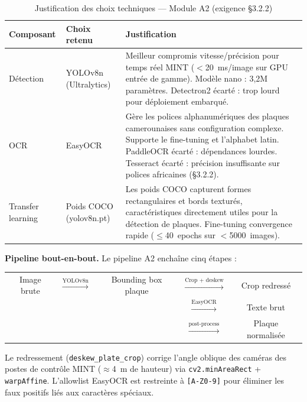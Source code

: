 \begin{table}[H]
  \centering
  \caption{Justification des choix techniques — Module A2 (exigence §3.2.2)}
  \label{tab:choix_a2}
  \begin{tabularx}{\textwidth}{lXX}
    \toprule
    Composant & Choix retenu & Justification \\
    \midrule
    Détection       & YOLOv8n (Ultralytics) &
      Meilleur compromis vitesse/précision pour temps réel MINT ($<$20~ms/image
      sur GPU entrée de gamme). Modèle nano : 3{,}2M paramètres.
      Detectron2 écarté : trop lourd pour déploiement embarqué. \\[6pt]
    OCR             & EasyOCR &
      Gère les polices alphanumériques des plaques camerounaises sans
      configuration complexe. Supporte le fine-tuning et l'alphabet latin.
      PaddleOCR écarté : dépendances lourdes. Tesseract écarté : précision
      insuffisante sur polices africaines (§3.2.2). \\[6pt]
    Transfer learning & Poids COCO (yolov8n.pt) &
      Les poids COCO capturent formes rectangulaires et bords texturés,
      caractéristiques directement utiles pour la détection de plaques.
      Fine-tuning convergence rapide ($\leq$40~epochs sur $<$5000~images). \\
    \bottomrule
  \end{tabularx}
\end{table}

\medskip
\textbf{Pipeline bout-en-bout.} Le pipeline A2 enchaîne cinq étapes :

\begin{center}
\begin{tabular}{ccccc}
  Image brute & $\xrightarrow{\text{YOLOv8n}}$ & Bounding box plaque &
    $\xrightarrow{\text{Crop + deskew}}$ & Crop redressé \\
  & & & $\xrightarrow{\text{EasyOCR}}$ & Texte brut \\
  & & & $\xrightarrow{\text{post-process}}$ & Plaque normalisée \\
\end{tabular}
\end{center}

Le redressement (\texttt{deskew\_plate\_crop}) corrige l'angle oblique des
caméras des postes de contrôle MINT ($\approx$4~m de hauteur) via
\texttt{cv2.minAreaRect} + \texttt{warpAffine}. L'allowlist EasyOCR est
restreinte à \texttt{[A-Z0-9]} pour éliminer les faux positifs liés aux
caractères spéciaux.

